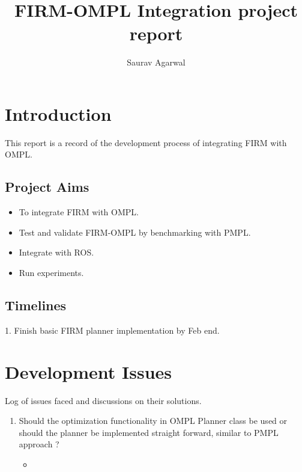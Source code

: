 \documentclass[10pt,a4paper]{report}
\author{Saurav Agarwal}
\title{FIRM-OMPL Integration project report}
\begin{document}
\chapter{Introduction}

This report is a record of the development process of integrating FIRM with OMPL. 

\section{Project Aims}

\begin{itemize}
 \item To integrate FIRM with OMPL.
 \item Test and validate FIRM-OMPL by benchmarking with PMPL.
 \item Integrate with ROS.
 \item Run experiments.
\end{itemize}

\section{Timelines}

1. Finish basic FIRM planner implementation by Feb end.

\chapter{Development Issues}

Log of issues faced and discussions on their solutions.

\begin{enumerate}
 \item Should the optimization functionality in OMPL Planner class be used or should the planner be implemented straight forward, similar to PMPL approach ?
    \begin{itemize}
     \item 
    \end{itemize}

\end{enumerate}
\end{document}

